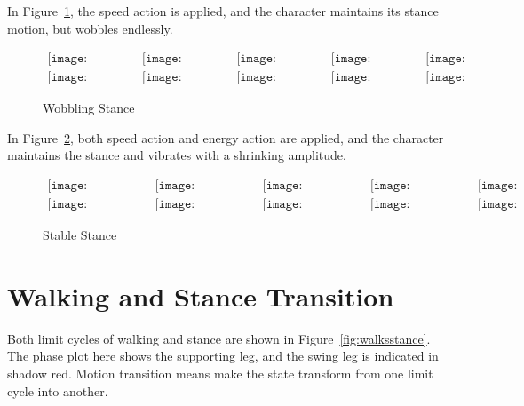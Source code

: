 In Figure~\ref{fig:stancespeed}, the speed action is applied, and the character maintains its stance motion, but wobbles endlessly.
\begin{figure}[!htbp]
  \begin{center}
  $
     \begin{array}{ccccc}
\texttt{[image: stancewobble/0001.eps]}&
\texttt{[image: stancewobble/0021.eps]}&
\texttt{[image: stancewobble/0041.eps]}&
\texttt{[image: stancewobble/0061.eps]}&
\texttt{[image: stancewobble/0081.eps]}
\\
\texttt{[image: stancewobble/0101.eps]}&
\texttt{[image: stancewobble/0121.eps]}&
\texttt{[image: stancewobble/0141.eps]}&
\texttt{[image: stancewobble/0161.eps]}&
\texttt{[image: stancewobble/0181.eps]}

\end{array}$
    \caption{Wobbling Stance}
    \label{fig:stancespeed}
\end{center}
\end{figure}

In Figure~\ref{fig:fastconverge}, both speed action and energy action are applied, and the character maintains the stance and  vibrates with a shrinking amplitude.
\begin{figure}[!htbp]
  \begin{center}
        $\begin{array}{ccccc}
\texttt{[image: stanceconverge/0001.eps]}&
\texttt{[image: stanceconverge/0021.eps]}&
\texttt{[image: stanceconverge/0041.eps]}&
\texttt{[image: stanceconverge/0061.eps]}&
\texttt{[image: stanceconverge/0081.eps]}
\\
\texttt{[image: stanceconverge/0101.eps]}&
\texttt{[image: stanceconverge/0121.eps]}&
\texttt{[image: stanceconverge/0141.eps]}&
\texttt{[image: stanceconverge/0161.eps]}&
\texttt{[image: stanceconverge/0181.eps]}

\end{array}$
    \caption{Stable Stance}
    \label{fig:fastconverge}
\end{center}
\end{figure}




\section{Walking and Stance Transition}
\label{sec:transmotion}
Both limit cycles of walking and stance are shown in Figure~\ref{fig:walksstance}.
The phase plot here shows the supporting leg, and the swing leg is indicated in shadow red.
Motion transition means make the state transform from one limit cycle into another.





